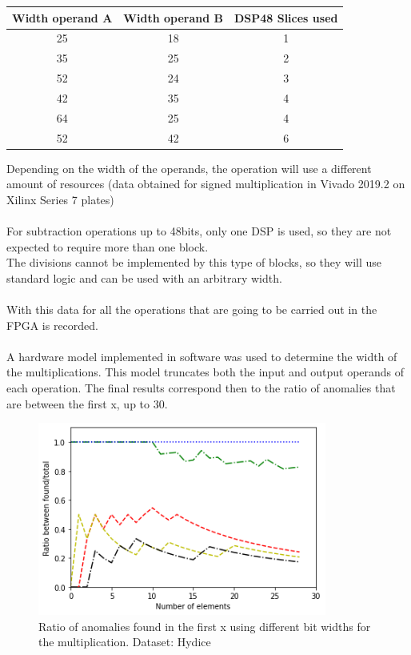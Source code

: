 \begin{center}
 \begin{tabular}{|c c |c|} 
 \hline
 Width operand A & Width operand B & DSP48 Slices used \\ [0.5ex] 
 \hline\hline
 25 & 18 & 1 \\ 
 \hline
 35 & 25 & 2 \\
 \hline
 52 & 24 & 3 \\
 \hline
 42 & 35 & 4 \\
 \hline
 64 & 25 & 4 \\
 \hline
 52 & 42 & 6 \\
 \hline
\end{tabular}
\end{center}
Depending on the width of the operands, the operation will use a different amount of resources (data obtained for signed multiplication in Vivado 2019.2 on Xilinx Series 7 plates)
\\
\\
For subtraction operations up to 48bits, only one DSP is used, so they are not expected to require more than one block.
\\
The divisions cannot be implemented by this type of blocks, so they will use standard logic and can be used with an arbitrary width.
\\
\\
With this data for all the operations that are going to be carried out in the FPGA is recorded.
\\
\\
A hardware model implemented in software was used to determine the width of the multiplications. This model truncates both the input and output operands of each operation. The final results correspond then to the ratio of anomalies that are between the first x, up to 30.
\begin{figure}[h!]
\centering
\includegraphics[height=2.5in]{figures/width.png}
\caption{Ratio of anomalies found in the first x using different bit widths for the multiplication. Dataset: Hydice}
  \label{fig:width}
\end{figure}

